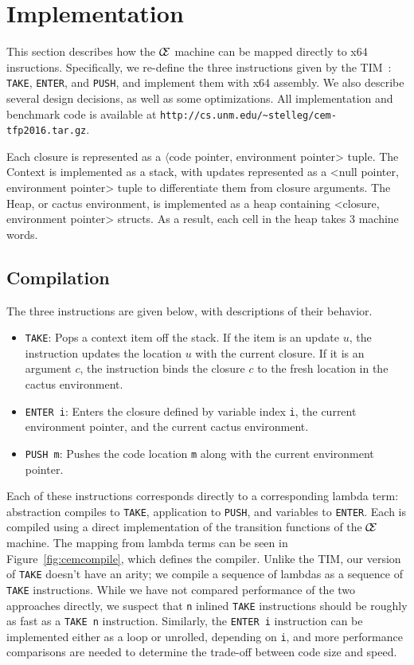 \section{Implementation} \label{sec:impl}

This section describes how the $\mathcal{\mathcal{C} \mskip -4mu \mathcal{E}}$
machine can be mapped directly to x64 insructions. Specifically, we re-define
the three instructions given by the TIM~\cite{TIM}: \texttt{TAKE},
\texttt{ENTER}, and \texttt{PUSH}, and implement them with x64 assembly. We
also describe several design decisions, as well as some optimizations. All
implementation and benchmark code is available at
\texttt{http://cs.unm.edu/\textasciitilde stelleg/cem-tfp2016.tar.gz}.

Each closure is represented as a $\langle$code pointer, environment pointer> tuple. The
Context is implemented as a stack, with updates represented as a <null pointer,
environment pointer> tuple to differentiate them from closure arguments. The
Heap, or cactus environment, is implemented as a heap containing <closure,
environment pointer> structs. As a result, each cell in the heap takes 3
machine words.

\subsection{Compilation}
The three instructions are given below, with descriptions of their behavior. 

\begin{itemize}
\item \texttt{TAKE}: Pops a context item off the stack. If the item is an
update $u$, the instruction updates the location $u$ with the current closure.
If it is an argument $c$, the instruction binds the closure $c$ to the fresh
location in the cactus environment.
\item \texttt{ENTER i}: Enters the closure defined by variable index \texttt{i},
the current environment pointer, and the current cactus environment.  \item
\texttt{PUSH m}: Pushes the code location \texttt{m} along with the
current environment pointer. 
\end{itemize}

Each of these instructions corresponds directly to a corresponding lambda term:
abstraction compiles to \texttt{TAKE}, application to \texttt{PUSH}, and
variables to \texttt{ENTER}. Each is compiled using a direct implementation of
the transition functions of the $\mathcal{\mathcal{C} \mskip -4mu \mathcal{E}}$
machine. The mapping from lambda terms can be seen in
Figure~\ref{fig:cemcompile}, which defines the compiler. Unlike the TIM, our
version of \texttt{TAKE} doesn't have an arity; we compile a sequence of
lambdas as a sequence of \texttt{TAKE} instructions.  While we have not
compared performance of the two approaches directly, we suspect that \texttt{n}
inlined \texttt{TAKE} instructions should be roughly as fast as a \texttt{TAKE
n} instruction.  Similarly, the \texttt{ENTER i} instruction can be implemented
either as a loop or unrolled, depending on \texttt{i}, and more performance
comparisons are needed to determine the trade-off between code size and speed.

